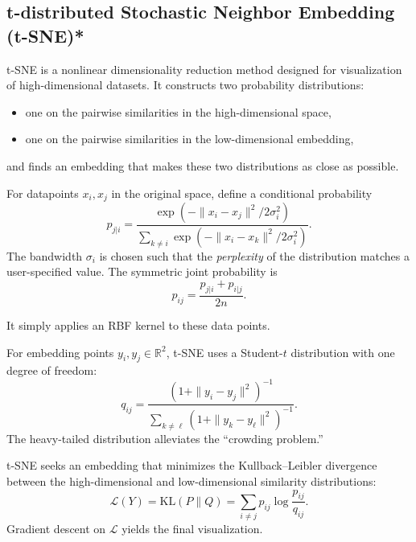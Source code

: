 \documentclass[../main]{subfiles}
\begin{document}
\subsection{t-distributed Stochastic Neighbor Embedding (t-SNE)*}

t-SNE is a nonlinear dimensionality reduction method designed for visualization 
of high-dimensional datasets.  
It constructs two probability distributions:
\begin{itemize}
    \item one on the pairwise similarities in the high-dimensional space,  
    \item one on the pairwise similarities in the low-dimensional embedding,
\end{itemize}
and finds an embedding that makes these two distributions as close as possible.


\begin{definition}
For datapoints $x_i, x_j$ in the original space, define a conditional probability
\begin{equation}
    p_{j|i}
    = \frac{\exp\!\left(-\|x_i - x_j\|^2 / 2\sigma_i^2\right)}
            {\sum_{k \neq i} \exp\!\left(-\|x_i - x_k\|^2 / 2\sigma_i^2\right)}.
\end{equation}
The bandwidth $\sigma_i$ is chosen such that the \emph{perplexity}
of the distribution matches a user-specified value.
The symmetric joint probability is
\begin{equation}
    p_{ij} = \frac{p_{j|i} + p_{i|j}}{2n}.
\end{equation}
\end{definition}
\begin{note}
    It simply applies an RBF kernel to these data points.
\end{note}
\begin{definition}
For embedding points $y_i, y_j \in \mathbb{R}^2$,  
t-SNE uses a Student-\(t\) distribution with one degree of freedom:
\begin{equation}
    q_{ij}
    =
    \frac{\left(1 + \|y_i - y_j\|^2\right)^{-1}}
            {\sum_{k \neq \ell}
            \left(1 + \|y_k - y_\ell\|^2\right)^{-1}}.
\end{equation}
The heavy-tailed distribution alleviates the “crowding problem.”
\end{definition}

\begin{theorem}
t-SNE seeks an embedding that minimizes the Kullback–Leibler divergence
between the high-dimensional and low-dimensional similarity distributions:
\begin{equation}
    \mathcal{L}(Y)
    = \mathrm{KL}(P \parallel Q)
    = \sum_{i \neq j} p_{ij} \log \frac{p_{ij}}{q_{ij}}.
\end{equation}
Gradient descent on $\mathcal{L}$ yields the final visualization.
\end{theorem}
\end{document}

